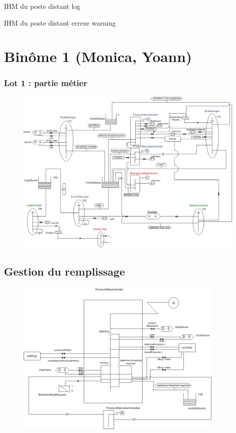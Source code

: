 \documentclass{beamer}
\begin{document}
	\begin{frame}
		IHM du poste distant
		log
	\end{frame}

	\begin{frame}
		IHM du poste distant
		erreur \/ warning
	\end{frame}

\section{Binôme 1 (Monica, Yoann)}
	\begin{frame}
\frametitle{Lot 1 : partie métier}
	\begin{figure}
		\centering
		\includegraphics[height=0.8\textheight]{../../SchemasLCG/schemaGlobal.png}
	\end{figure}
	\end{frame}

\subsection{Gestion du remplissage}
	\begin{frame}
	\begin{figure}
		\centering
		\includegraphics[width=0.9\textwidth]{../../SchemasLCG/ProductInflowHandler.png}
	\end{figure}
	\end{frame}
\end{document}
